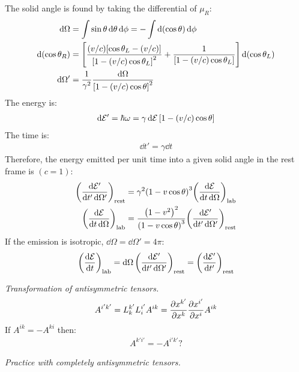\documentclass{report}
\begin{document}
\begin{subquests}
\begin{subquests}
		\item The solid angle is found by taking the differential of $\mu_R$:
		\begin{align*}
			\dd{\Omega} & = \int\sin\theta\dd{\theta}\dd{\phi} = -\int\dd(\cos\theta)\dd{\phi} \\
			\dd(\cos\theta_R) & = \bqty{\frac{(v/c)\bqty{\cos\theta_L - (v/c)}}{\bqty{1-(v/c)\cos\theta_L}^2} + \frac{1}{\bqty{1-(v/c)\cos\theta_L}}}\dd(\cos\theta_L) \\
			\dd{\Omega'} & = \frac{1}{\gamma^2}\frac{\dd{\Omega}}{\bqty{1-(v/c)\cos\theta}^2}
		\end{align*}
		The energy is:
		\begin{align*}
			\dd{\mathcal E'} = \hbar \omega = \gamma \dd{\mathcal E}\bqty{1-(v/c)\cos \theta} 
		\end{align*}
		The time is:
		\begin{align*}
			\dd{t'} = \gamma \dd{t}
		\end{align*}
		Therefore, the energy emitted per unit time into a given solid angle in the rest frame is $(c=1)$:
		\begin{align*}
			\pqty{\frac{\dd{\mathcal E'}}{\dd{t'}{\dd\Omega'}}}_{\mathrm{rest}} & = \gamma^2\pqty{1-v\cos\theta}^3\pqty{\frac{\dd{\mathcal E}}{\dd{t}\dd{\Omega}}}_{\mathrm{lab}} \\
			\pqty{\frac{\dd{\mathcal E}}{\dd{t}\dd{\Omega}}}_{\mathrm{lab}} & = \frac{\pqty{1-v^2}^2}{\pqty{1-v\cos\theta}^3}\pqty{\frac{\dd{\mathcal E'}}{\dd{t'}{\dd\Omega'}}}_{\mathrm{rest}}
		\end{align*}
		If the emission is isotropic, $\dd{\Omega} = \dd{\Omega'} = 4\pi$:
		\begin{align*}
			\pqty{\dv{\mathcal E}{t}}_{\mathrm{lab}}  = \dd{\Omega}\pqty{\frac{\dd{\mathcal E'}}{\dd{t'}{\dd\Omega'}}}_{\mathrm{rest}} = \pqty{\dv{\mathcal E'}{t'}}_{\mathrm{rest}}
		\end{align*}
	\end{subquests}

	\item \emph{Transformation of antisymmetric tensors.}
	\begin{align*}
		A^{i'k'} = L^{k'}_k L^{i'}_i A^{ik} = \pdv{x^{k'}}{x^k}\pdv{x^{i'}}{x^i}A^{ik}
	\end{align*}
	If $A^{ik} = -A^{ki}$ then:
	\begin{align*}
		A^{k'i'} = - A^{i'k'} ?
	\end{align*}

	\item \emph{Practice with completely antisymmetric tensors.}
	\begin{subquests}
		\item 


\end{subquests}
\end{subquests}
\end{document}
